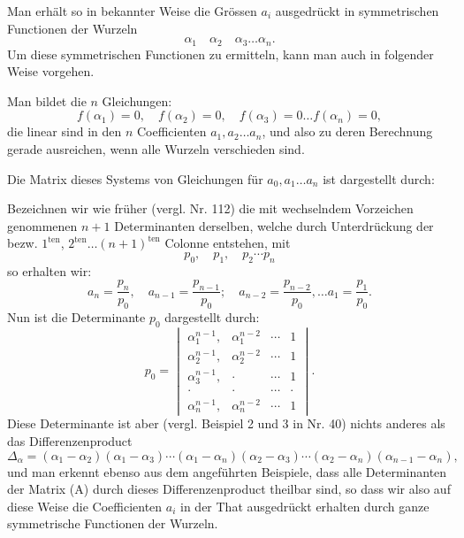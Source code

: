 Man erhält so in bekannter Weise die Grössen $a_i$ ausgedrückt in symmetrischen Functionen der Wurzeln
\[
\alpha_1 \quad \alpha_2 \quad \alpha_3 \ldots \alpha_n.
\]
Um diese symmetrischen Functionen zu ermitteln, kann man auch in folgender Weise vorgehen.

Man bildet die $n$ Gleichungen:
\[
f(\alpha_1) = 0, \quad f(\alpha_2) = 0, \quad f(\alpha_3) = 0 \ldots f(\alpha_n) = 0,
\]
die linear sind in den $n$ Coefficienten $a_1, a_2 \ldots a_n$, und also zu deren Berechnung gerade ausreichen, wenn alle Wurzeln verschieden sind.

Die Matrix dieses Systems von Gleichungen für $a_0, a_1 \ldots a_n$ ist dargestellt durch:


Bezeichnen wir wie früher (vergl. Nr. 112) die mit wechselndem Vorzeichen genommenen $n+1$ Determinanten derselben, welche durch Unterdrückung der bezw. $1^{\mathrm{ten}}$, $2^{\mathrm{ten}} \ldots (n+1)^{\mathrm{ten}}$ Colonne entstehen, mit
\[
p_0, \quad p_1, \quad p_2 \cdots p_n %
\]
so erhalten wir:
\[
a_n = \frac{p_n}{p_0}, \quad a_{n-1} = \frac{p_{n-1}}{p_0}; \quad a_{n-2} = \frac{p_{n-2}}{p_0}, \ldots a_1 = \frac{p_1}{p_0}.
\]
Nun ist die Determinante $p_0$ dargestellt durch:
\[
p_0 =
\begin{vmatrix}
\alpha_1^{n-1}, & \alpha_1^{n-2} & \cdots & 1 \\
\alpha_2^{n-1}, & \alpha_2^{n-2} & \cdots & 1 \\
\alpha_3^{n-1}, & \cdot & \cdots & 1 \\
\cdot & \cdot & \cdots & \cdot \\
\alpha_n^{n-1}, & \alpha_n^{n-2} & \cdots & 1
\end{vmatrix}.
\]
Diese Determinante ist aber (vergl. Beispiel 2 und 3 in Nr. 40) nichts anderes als das Differenzenproduct
\[
\Delta_\alpha = (\alpha_1-\alpha_2)(\alpha_1-\alpha_3)\cdots(\alpha_1-\alpha_n)
(\alpha_2-\alpha_3)\cdots(\alpha_2-\alpha_n)
(\alpha_{n-1}-\alpha_n),
\]
und man erkennt ebenso aus dem angeführten Beispiele, dass alle Determinanten der Matrix (A) durch dieses Differenzenproduct theilbar sind, so dass wir also auf diese Weise die Coefficienten $a_i$ in der That ausgedrückt erhalten durch ganze symmetrische Functionen der Wurzeln.

